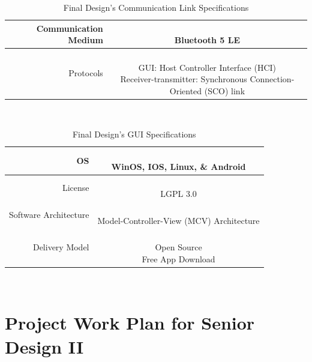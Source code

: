 \documentclass[12pt]{article}
\begin{document}
\begin{table}[h!]
\centering
\caption{Final Design's Communication Link Specifications}
\begin{tabular} {| r | c | }
\hline
\parbox{0.3\linewidth}{\raggedleft
 Communication Medium
} &   \parbox{0.65\linewidth}{\hfill \\
Bluetooth 5 LE
}\\
\hline
\parbox{0.3\linewidth}{\raggedleft
Protocols
} &   \parbox{0.65\linewidth}{\hfill \\
GUI: Host Controller Interface (HCI)\\
Receiver-\>transmitter: Synchronous Connection-Oriented (SCO) link
}\\
\hline
%
%
\end{tabular}
\end{table}
\hfill \\


\begin{table}[h!]
\centering
\caption{Final Design's GUI Specifications}
\begin{tabular} {| r | c | }
\hline
\parbox{0.3\linewidth}{\raggedleft
OS
} &   \parbox{0.65\linewidth}{\hfill \\
WinOS, IOS, Linux, \& Android
}\\
\hline
\parbox{0.3\linewidth}{\raggedleft
License
} &   \parbox{0.65\linewidth}{\hfill \\
 LGPL 3.0
}\\
\hline
\parbox{0.3\linewidth}{\raggedleft
Software Architecture
} &   \parbox{0.65\linewidth}{\hfill \\
Model-Controller-View (MCV) Architecture
}\\
\hline
\hline
\parbox{0.3\linewidth}{\raggedleft
Delivery Model 
} &   \parbox{0.65\linewidth}{\hfill \\
Open Source\\
Free App Download
}\\
\hline
%
%
\end{tabular}
\end{table}
\hfill \\

\section{Project Work Plan for Senior Design II}
\end{document}
